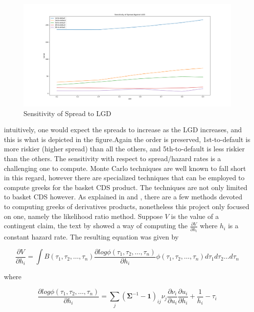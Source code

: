 \documentclass[a4paper,12pt]{article}
\begin{document}
\begin{figure}[h]

\centering
\includegraphics[width=1\textwidth]{sensitivity_wrt_lgd}
\caption{Sensitivity of Spread to LGD}
\label{image-sens_lgd}

\end{figure} 

intuitively, one would expect the spreads to increase as the LGD increases, and this is what is depicted in the figure.Again the order is preserved, 1st-to-default is more riskier (higher spread) than all the others, and 5th-to-default is less riskier than the others. 
\newline
The sensitivity with respect to spread/hazard rates is a challenging one to compute. Monte Carlo techniques are well known to fall short in this regard, however there are specialized techniques that can be employed to compute greeks for the basket CDS product. The techniques are not only limited to basket CDS however. As explained in \cite{joshi_kainth} and \cite{peter_jackel}, there are a few methods devoted to computing greeks of derivatives products, nonetheless this project only focused on one, namely the likelihood ratio method. Suppose $V$ is the value of a contingent claim, the text by \cite{joshi_kainth} showed a way of computing the $\frac{\partial V}{\partial h_i}$ where $h_i$ is a constant hazard rate. The resulting equation was given by 

\begin{equation}
\frac{\partial V}{\partial h_i} = \int B(\tau_1, \tau_2, \dots, \tau_n)\frac{\partial log\phi(\tau_1, \tau_2, \dots, \tau_n)}{\partial h_i}\phi(\tau_1, \tau_2, \dots, \tau_n)d\tau_1 d\tau_2 \dots d\tau_n
\end{equation}

where 

$$ \frac{\partial log\phi(\tau_1, \tau_2, \dots, \tau_n)}{\partial h_i} = \sum_{j}(\mathbf{\Sigma}^{-1} - \mathbf{1})_{ij}\nu_j\frac{\partial \nu_i}{\partial u_i}\frac{\partial u_i}{\partial h_i} + \frac{1}{h_i} - \tau_i$$
\end{document}
